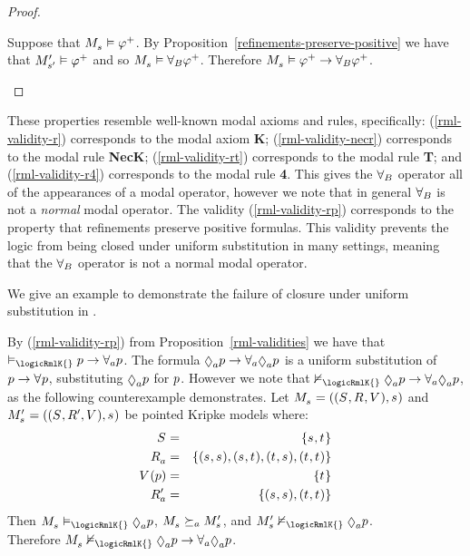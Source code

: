 \begin{proof}
\begin{description}
        Suppose that $\kPModel{\kStateS} \entails \phi^+$.
        By Proposition~\ref{refinements-preserve-positive} we have that ${M^{\prime}_{{s}^{\prime}}} \vDash \varphi^+$ and so $\kPModel{\kStateS} \entails \allrefsBs \phi^+$.
        Therefore $\kPModel{\kStateS} \entails \phi^+ \implies \allrefsBs \phi^+$.
\end{description}
\end{proof}

These properties resemble well-known modal axioms and rules, specifically:
(\ref{rml-validity-r}) corresponds to the modal axiom {\bf K};
(\ref{rml-validity-necr}) corresponds to the modal rule {\bf NecK};
(\ref{rml-validity-rt}) corresponds to the modal rule {\bf T}; and
(\ref{rml-validity-r4}) corresponds to the modal rule {\bf 4}.
This gives the ${\forall_{B}}$ operator all of the appearances of a modal operator, however we note that in general ${\forall_{B}}$ is not a {\em normal} modal operator.
The validity (\ref{rml-validity-rp}) corresponds to the property that refinements preserve positive formulas.
This validity prevents the logic from being closed under uniform substitution in many settings, meaning that the ${\forall_{B}}$ operator is not a normal modal operator.

We give an example to demonstrate the failure of closure under uniform substitution in \logicRmlK{}.

\begin{example}\label{example-uniform-substitution}
By (\ref{rml-validity-rp}) from Proposition~\ref{rml-validities} we have that $\entails_\logicRmlK{} \atomP \implies \allrefsA \atomP$.
The formula $\possibleA \atomP \implies \allrefsA \possibleA \atomP$ is a uniform substitution of $\atomP \implies \allrefs \atomP$, substituting $\possibleA \atomP$ for $p$.
However we note that $\nentails_\logicRmlK{} \possibleA \atomP \implies \allrefsA \possibleA \atomP$, as the following counterexample demonstrates.
Let $\kPModelAndTuple{\kStateS}$ and $\kPModelP{\kStateS} = ((\kStates, \kAccessibilityP{}, \kValuation), \kStateS)$ be pointed Kripke models where:
\begin{eqnarray*}
    \kStates &=& \{\kStateS, \kStateT\}\\
    \kAccessibilityA &=& \{(\kStateS, \kStateS), (\kStateS, \kStateT), (\kStateT, \kStateS), (\kStateT, \kStateT)\}\\
    \kValuation(\atomP) &=& \{\kStateT\}\\
    \kAccessibilityPA &=& \{(\kStateS, \kStateS), (\kStateT, \kStateT)\}
\end{eqnarray*}
Then $\kPModel{\kStateS} \entails_\logicRmlK{} \possibleA \atomP$, $\kPModel{\kStateS} \simulatesA \kPModelP{\kStateS}$, and $\kPModelP{\kStateS} \nentails_\logicRmlK{} \possibleA \atomP$.\\
Therefore $\kPModel{\kStateS} \nentails_\logicRmlK{} \possibleA \atomP \implies \allrefsA \possibleA \atomP$.
\end{example}

